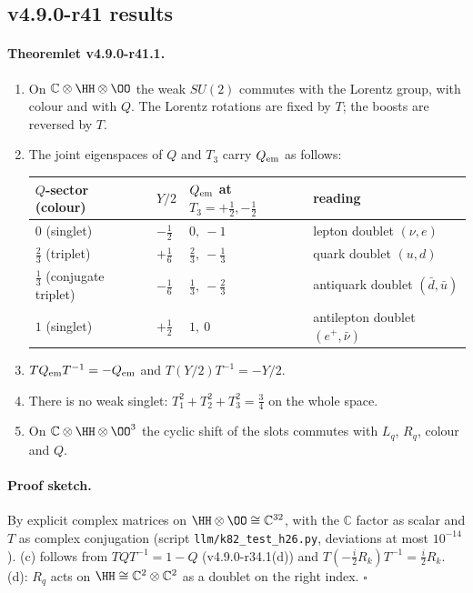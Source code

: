 \subsection*{v4.9.0-r41 results}
\label{subsec:v490-r41-results}

\paragraph{Theoremlet v4.9.0-r41.1.}
\begin{enumerate}[leftmargin=2em]
\item[(a)] On \(\mathbb C\otimes\HH\otimes\OO\) the weak \(SU(2)\) commutes with the Lorentz group, with colour and with \(Q\).  The Lorentz
rotations are fixed by \(T\); the boosts are reversed by \(T\).
\item[(b)] The joint eigenspaces of \(Q\) and \(T_3\) carry \(Q_{\rm em}\) as follows:
\begin{center}
\small
\begin{tabular}{@{}llll@{}}
\toprule
\(Q\)-sector (colour) & \(Y/2\) & \(Q_{\rm em}\) at \(T_3=+\tfrac12,-\tfrac12\) & reading\\
\midrule
\(0\) (singlet) & \(-\tfrac12\) & \(0,\ -1\) & lepton doublet \((\nu,e)\)\\
\(\tfrac23\) (triplet) & \(+\tfrac16\) & \(\tfrac23,\ -\tfrac13\) & quark doublet \((u,d)\)\\
\(\tfrac13\) (conjugate triplet) & \(-\tfrac16\) & \(\tfrac13,\ -\tfrac23\) & antiquark doublet \((\bar d,\bar u)\)\\
\(1\) (singlet) & \(+\tfrac12\) & \(1,\ 0\) & antilepton doublet \((e^+,\bar\nu)\)\\
\bottomrule
\end{tabular}
\end{center}
\item[(c)] \(TQ_{\rm em}T^{-1}=-Q_{\rm em}\) and \(T(Y/2)T^{-1}=-Y/2\).
\item[(d)] There is no weak singlet: \(T_1^2+T_2^2+T_3^2=\tfrac34\) on the whole space.
\item[(e)] On \(\mathbb C\otimes\HH\otimes\OO^3\) the cyclic shift of the slots commutes with \(L_q\), \(R_q\), colour and \(Q\).
\end{enumerate}

\paragraph{Proof sketch.}
By explicit complex matrices on \(\HH\otimes\OO\cong\mathbb C^{32}\), with the \(\mathbb C\) factor as scalar and \(T\) as complex conjugation
(script \texttt{llm/k82\_test\_h26.py}, deviations at most \(10^{-14}\)).  (c) follows from \(TQT^{-1}=1-Q\) (v4.9.0-r34.1(d)) and
\(T(-\tfrac i2R_k)T^{-1}=\tfrac i2R_k\).  (d): \(R_q\) acts on \(\HH\cong\mathbb C^2\otimes\mathbb C^2\) as a doublet on the right index.  \(\square\)

